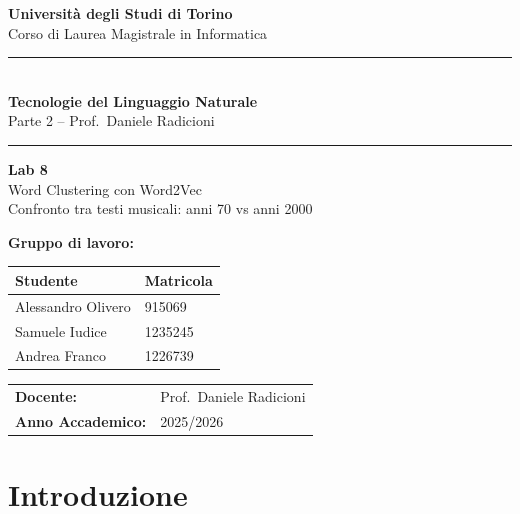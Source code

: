 \documentclass[12pt,a4paper]{article}
\newcommand{\HRule}{\rule{\linewidth}{0.5mm}}
\begin{document}
\raggedbottom

\begin{titlepage}
  \centering
  \vspace*{1.5cm}

  {\Large\textbf{Universit\`a degli Studi di Torino}\\[0.3em]
  Corso di Laurea Magistrale in Informatica}

  \vspace{1cm}
  \HRule\\[0.4em]
  {\LARGE\textbf{Tecnologie del Linguaggio Naturale}}\\[0.3em]
  {\large Parte 2 -- Prof.\ Daniele Radicioni}\\[0.2em]
  \HRule

  \vspace{1.2cm}
  {\huge\textbf{Lab 8}}\\[0.5em]
  {\LARGE Word Clustering con Word2Vec}\\[0.4em]
  {\large Confronto tra testi musicali: anni 70 vs anni 2000}

  \vspace{2cm}

  {\large\textbf{Gruppo di lavoro:}}\\[0.8em]
  \begin{tabular}{ll}
    \toprule
    \textbf{Studente}    & \textbf{Matricola} \\
    \midrule
    Alessandro Olivero   & 915069  \\
    Samuele Iudice       & 1235245 \\
    Andrea Franco        & 1226739 \\
    \bottomrule
  \end{tabular}

  \vspace{1.5cm}
  \begin{tabular}{ll}
    \textbf{Docente:}          & Prof.\ Daniele Radicioni \\[0.3em]
    \textbf{Anno Accademico:}  & 2025/2026 \\
  \end{tabular}

  \vfill
\end{titlepage}

\tableofcontents
\newpage

\section{Introduzione}
\end{document}
